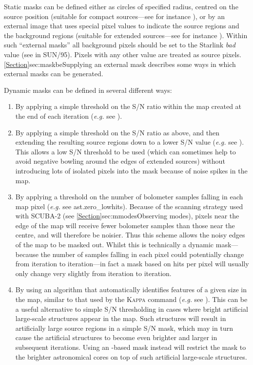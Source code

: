 Static masks can be defined either as circles of specified radius,
centred on the source position (suitable for compact sources---see for
instance ), or by an external
image that uses special pixel values to indicate the source regions and
the background regions (suitable for extended sources---see for
instance ). Within such ``external
masks'' all background pixels should be set to the Starlink \emph{bad} value
(see  in SUN/95).
Pixels with any other value are treated as source pixels.
\cref{Section}{sec:maskbe}{Supplying an external mask} describes some
ways in which external masks can be generated.

Dynamic masks can be defined in several different ways:
\begin{enumerate}
\item By applying a simple threshold on the S/N ratio within the map
created at the end of each iteration (\emph{e.g.} see
).
\item By applying a simple threshold on the S/N ratio as above, and then
extending the resulting source regions down to a lower S/N value (\emph{e.g.}
see ). This allows a low S/N
threshold to be used (which can sometimes help to avoid negative bowling
around the edges of extended sources) without introducing lots of isolated
pixels into the mask because of noise spikes in the map.
\item By applying a threshold on the number of bolometer samples falling
in each map pixel (\emph{e.g.} see 
{ast.zero\_lowhits}). Because of the scanning strategy used with SCUBA-2
(see \cref{Section}{sec:mmodes}{Observing modes}), pixels near the edge of
the map will receive fewer bolometer samples than those near the centre,
and will therefore be noisier. Thus this scheme allows the noisy edges of
the map to be masked out. Whilst this is technically a dynamic mask---because
the number of samples falling in each pixel could potentially change
from iteration to iteration---in fact a mask based on hits per pixel
will usually only change very slightly from iteration to iteration.
\item By using an algorithm that automatically identifies features of a
given size in the map, similar to that used by the \textsc{Kappa}
 command (\emph{e.g.} see
). This can be a
useful alternative to simple S/N thresholding in cases where bright artificial
large-scale structures appear in the map. Such structures will result in
artificially large source regions in a simple S/N mask, which may in turn
cause the artificial structures to become even brighter and larger in
subsequent iterations. Using an -based mask instead will
restrict the mask to the brighter astronomical cores on top of such artificial
large-scale structures.
\end{enumerate}

